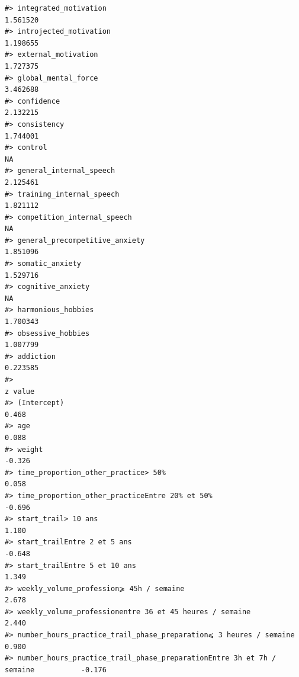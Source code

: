 \documentclass[
]{article}
\begin{document}
\begin{verbatim}
#> integrated_motivation                                                            1.561520
#> introjected_motivation                                                           1.198655
#> external_motivation                                                              1.727375
#> global_mental_force                                                              3.462688
#> confidence                                                                       2.132215
#> consistency                                                                      1.744001
#> control                                                                                NA
#> general_internal_speech                                                          2.125461
#> training_internal_speech                                                         1.821112
#> competition_internal_speech                                                            NA
#> general_precompetitive_anxiety                                                   1.851096
#> somatic_anxiety                                                                  1.529716
#> cognitive_anxiety                                                                      NA
#> harmonious_hobbies                                                               1.700343
#> obsessive_hobbies                                                                1.007799
#> addiction                                                                        0.223585
#>                                                                                z value
#> (Intercept)                                                                      0.468
#> age                                                                              0.088
#> weight                                                                          -0.326
#> time_proportion_other_practice> 50%                                              0.058
#> time_proportion_other_practiceEntre 20% et 50%                                  -0.696
#> start_trail> 10 ans                                                              1.100
#> start_trailEntre 2 et 5 ans                                                     -0.648
#> start_trailEntre 5 et 10 ans                                                     1.349
#> weekly_volume_profession⩾ 45h / semaine                                          2.678
#> weekly_volume_professionentre 36 et 45 heures / semaine                          2.440
#> number_hours_practice_trail_phase_preparation⩽ 3 heures / semaine                0.900
#> number_hours_practice_trail_phase_preparationEntre 3h et 7h / semaine           -0.176

\end{verbatim}
\end{document}
